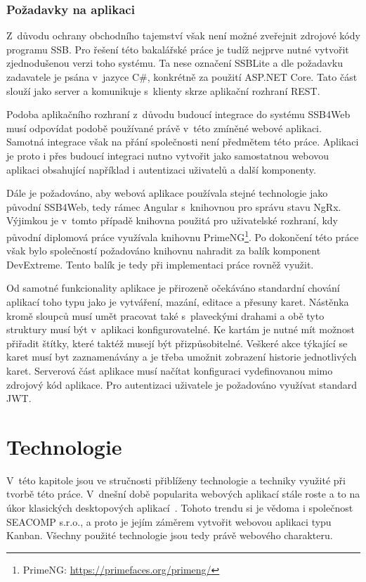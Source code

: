 \subsection{Požadavky na aplikaci}
Z~důvodu ochrany obchodního tajemství však není možné zveřejnit zdrojové kódy programu SSB. Pro řešení této bakalářské práce je tudíž nejprve nutné vytvořit zjednodušenou verzi toho systému. Ta nese označení SSBLite a dle požadavku zadavatele je psána v~jazyce C\#, konkrétně za použití ASP.NET Core. Tato část slouží jako server a komunikuje s~klienty skrze aplikační rozhraní REST.

Podoba aplikačního rozhraní z~důvodu budoucí integrace do systému SSB4Web musí odpovídat podobě používané právě v~této zmíněné webové aplikaci. Samotná integrace však na přání společnosti není předmětem této práce. Aplikaci je proto i přes budoucí integraci nutno vytvořit jako samostatnou webovou aplikaci obsahující například i autentizaci uživatelů a další komponenty.

Dále je požadováno, aby webová aplikace používala stejné technologie jako původní SSB4Web, tedy rámec Angular s~knihovnou pro správu stavu NgRx. Výjimkou je v~tomto případě knihovna použitá pro uživatelské rozhraní, kdy původní diplomová práce využívala knihovnu PrimeNG\footnote{PrimeNG: \url{https://primefaces.org/primeng/}}. Po dokončení této práce však bylo společností požadováno knihovnu nahradit za balík komponent DevExtreme. Tento balík je tedy při implementaci práce rovněž využit.

Od samotné funkcionality aplikace je přirozeně očekáváno standardní chování aplikací toho typu jako je vytváření, mazání, editace a přesuny karet. Nástěnka kromě sloupců musí umět pracovat také s~plaveckými drahami a obě tyto struktury musí být v~aplikaci konfigurovatelné. Ke kartám je nutné mít možnost přiřadit štítky, které taktéž musejí být přizpůsobitelné. Veškeré akce týkající se karet musí byt zaznamenávány a je třeba umožnit zobrazení historie jednotlivých karet.
Serverová část aplikace musí načítat konfiguraci vydefinovanou mimo zdrojový kód aplikace. Pro autentizaci uživatele je požadováno využívat standard JWT.




\chapter{Technologie}
V~této kapitole jsou ve stručnosti přiblíženy technologie a techniky využité při tvorbě této práce. 
V~dnešní době popularita webových aplikací stále roste a to na úkor klasických desktopových aplikací~\cite{bib:web-apps-popular}. Tohoto trendu si je vědoma i společnost SEACOMP s.r.o., a proto je jejím záměrem vytvořit webovou aplikaci typu Kanban. Všechny použité technologie jsou tedy právě webového charakteru.


